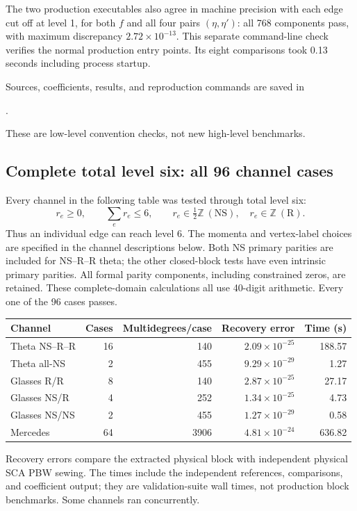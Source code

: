 \documentclass[11pt]{article}
\newcommand{\NS}{\mathrm{NS}}
\newcommand{\R}{\mathrm R}
\numberwithin{equation}{section}
\begin{document}
The two production executables also agree in machine precision with each
edge cut off at level 1, for both $f$ and all four pairs $(\eta,\eta')$:
all 768 components pass, with maximum discrepancy $2.72\times10^{-13}$.
This separate command-line check verifies the normal production entry
points. Its eight comparisons took 0.13 seconds including process startup.

Sources, coefficients, results, and reproduction commands are saved in
\begin{center}\small
{}.
\end{center}
These are low-level convention checks, not new high-level benchmarks.

\subsection{Complete total level six: all 96 channel cases}
\label{sec:total-six}

Every channel in the following table was tested through total level six:
\begin{equation}
 r_e\ge0,\qquad \sum_e r_e\le6,
 \qquad r_e\in\tfrac12\mathbb Z\ (\NS),\quad
 r_e\in\mathbb Z\ (\R).
 \label{eq:total-six-domain}
\end{equation}
Thus an individual edge can reach level 6. The momenta and vertex-label
choices are specified in the channel descriptions below. Both NS primary parities
are included for NS--R--R theta; the other closed-block tests have even
intrinsic primary parities. All formal parity components, including
constrained zeros, are retained. These complete-domain calculations all use
40-digit arithmetic. Every one of the 96 cases passes.

\begin{center}
\small
\begin{tabular}{@{}lrrrr@{}}
\toprule
Channel & Cases & Multidegrees/case & Recovery error & Time (s)\\
\midrule
Theta NS--R--R & 16 & 140 & $2.09\times10^{-25}$ & 188.57\\
Theta all-NS & 2 & 455 & $9.29\times10^{-29}$ & 1.27\\
Glasses R/R & 8 & 140 & $2.87\times10^{-25}$ & 27.17\\
Glasses NS/R & 4 & 252 & $1.34\times10^{-25}$ & 4.73\\
Glasses NS/NS & 2 & 455 & $1.27\times10^{-29}$ & 0.58\\
Mercedes & 64 & 3906 & $4.81\times10^{-24}$ & 636.82\\
\bottomrule
\end{tabular}
\end{center}
Recovery errors compare the extracted physical block with independent
physical SCA PBW sewing. The times include the independent references,
comparisons, and coefficient output; they are validation-suite wall times,
not production block benchmarks. Some channels ran concurrently.
\end{document}
